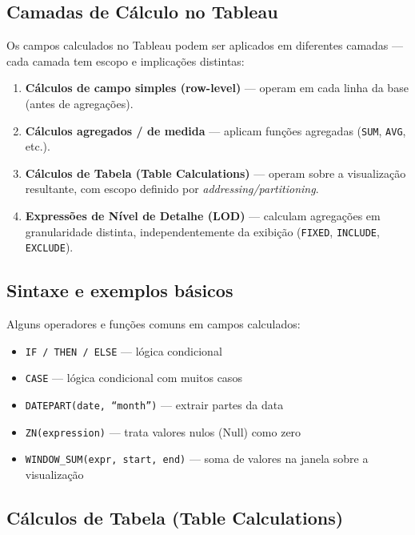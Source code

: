 \subsection{Camadas de Cálculo no Tableau}

Os campos calculados no Tableau podem ser aplicados em diferentes camadas — cada camada tem escopo e implicações distintas:

\begin{enumerate}[leftmargin=*]
  \item \textbf{Cálculos de campo simples (row-level)} — operam em cada linha da base (antes de agregações).
  \item \textbf{Cálculos agregados / de medida} — aplicam funções agregadas (\texttt{SUM}, \texttt{AVG}, etc.).
  \item \textbf{Cálculos de Tabela (Table Calculations)} — operam sobre a visualização resultante, com escopo definido por \textit{addressing/partitioning}.
  \item \textbf{Expressões de Nível de Detalhe (LOD)} — calculam agregações em granularidade distinta, independentemente da exibição (\texttt{FIXED}, \texttt{INCLUDE}, \texttt{EXCLUDE}).
\end{enumerate}

\subsection{Sintaxe e exemplos básicos}

Alguns operadores e funções comuns em campos calculados:

\begin{itemize}[leftmargin=*]
  \item \texttt{IF / THEN / ELSE} — lógica condicional  
  \item \texttt{CASE} — lógica condicional com muitos casos  
  \item \texttt{DATEPART(date, “month”)} — extrair partes da data  
  \item \texttt{ZN(expression)} — trata valores nulos (Null) como zero  
  \item \texttt{WINDOW\_SUM(expr, start, end)} — soma de valores na janela sobre a visualização  
\end{itemize}

\subsection{Cálculos de Tabela (Table Calculations)}

